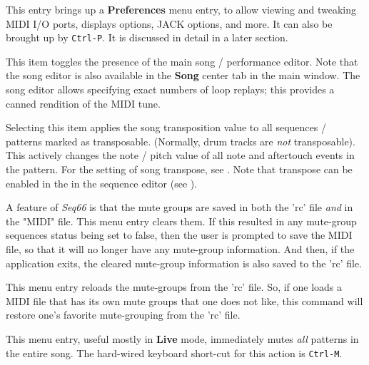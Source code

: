    \setcounter{ItemCounter}{0}      %

   This entry brings up a \textbf{Preferences} menu entry,
   to allow viewing and tweaking MIDI I/O ports, displays options, JACK
   options, and more.
   It can also be brought up by \texttt{Ctrl-P}.
   It is discussed in detail in a later section.

   This item toggles the presence of the main song / performance editor.
   Note that the song editor is also available in the
   \textbf{Song} center tab in the main window.
   The song editor allows specifying exact numbers of loop replays;
   this provides a canned rendition of the MIDI tune.

   Selecting this item applies the song transposition value to
   all sequences / patterns marked as transposable.
   (Normally, drum tracks are \textsl{not} transposable).
   This actively changes the note / pitch value of all note and aftertouch
   events in the pattern.
   For the setting of song transpose, see
   .
   Note that transpose can be enabled in the
   in the sequence editor
   (see ).

   A feature of \textsl{Seq66} is that the mute groups
   are saved in both the 'rc' file \textsl{and} in the "MIDI" file.
   This menu entry clears them. If this resulted in any mute-group sequences
   status being set to false, then the user is prompted to save the MIDI
   file, so that it will no longer have any
   mute-group information.  And then, if the
   application exits, the cleared mute-group information is also saved to
   the 'rc' file.

   This menu entry reloads the mute-groups from the 'rc' file.
   So, if one loads a MIDI file that has its own mute groups that one does not
   like, this command will restore one's favorite mute-grouping from the 'rc'
   file.

   This menu entry, useful mostly in \textbf{Live} mode,
   immediately mutes \textsl{all} patterns in the entire song.
   The hard-wired keyboard short-cut for this action is \texttt{Ctrl-M}.

